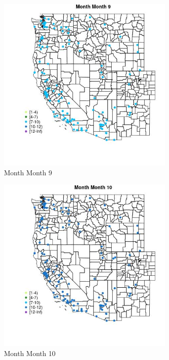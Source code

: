 \begin{figure} 
\centering  
\includegraphics[width=0.77\textwidth]{Code_Outputs/Report_ML_input_PM25_Step4_part_e_de_duplicated_aves_MapObsMo9Month.jpg} 
\caption{\label{fig:Report_ML_input_PM25_Step4_part_e_de_duplicated_avesMapObsMo9Month}Month Month 9} 
\end{figure} 
 

\begin{figure} 
\centering  
\includegraphics[width=0.77\textwidth]{Code_Outputs/Report_ML_input_PM25_Step4_part_e_de_duplicated_aves_MapObsMo10Month.jpg} 
\caption{\label{fig:Report_ML_input_PM25_Step4_part_e_de_duplicated_avesMapObsMo10Month}Month Month 10} 
\end{figure} 
 

